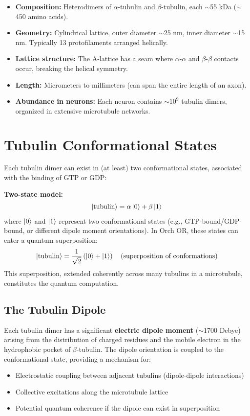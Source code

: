 \documentclass[11pt,a4paper]{report}
\begin{document}
\begin{biobox}
\begin{itemize}[leftmargin=1.5em]
  \item \textbf{Composition:} Heterodimers of $\alpha$-tubulin and $\beta$-tubulin, each $\sim$55 kDa ($\sim$450 amino acids).
  \item \textbf{Geometry:} Cylindrical lattice, outer diameter $\sim$25 nm, inner diameter $\sim$15 nm. Typically 13 protofilaments arranged helically.
  \item \textbf{Lattice structure:} The A-lattice has a seam where $\alpha$-$\alpha$ and $\beta$-$\beta$ contacts occur, breaking the helical symmetry.
  \item \textbf{Length:} Micrometers to millimeters (can span the entire length of an axon).
  \item \textbf{Abundance in neurons:} Each neuron contains $\sim 10^9$ tubulin dimers, organized in extensive microtubule networks.
\end{itemize}
\end{biobox}

\section{Tubulin Conformational States}

Each tubulin dimer can exist in (at least) two conformational states, associated with the binding of GTP or GDP:

\begin{mathbox}
\vspace{-6pt}
\textbf{Two-state model:}
\[
  \ket{\text{tubulin}} = \alpha\ket{0} + \beta\ket{1}
\]
where $\ket{0}$ and $\ket{1}$ represent two conformational states (e.g., GTP-bound/GDP-bound, or different dipole moment orientations). In Orch OR, these states can enter a quantum superposition:
\[
  \ket{\text{tubulin}} = \frac{1}{\sqrt{2}}\left(\ket{0} + \ket{1}\right) \quad \text{(superposition of conformations)}
\]
This superposition, extended coherently across many tubulins in a microtubule, constitutes the quantum computation.
\vspace{-4pt}
\end{mathbox}

\subsection{The Tubulin Dipole}

Each tubulin dimer has a significant \textbf{electric dipole moment} ($\sim$1700 Debye) arising from the distribution of charged residues and the mobile electron in the hydrophobic pocket of $\beta$-tubulin. The dipole orientation is coupled to the conformational state, providing a mechanism for:
\begin{itemize}[leftmargin=1.5em]
  \item Electrostatic coupling between adjacent tubulins (dipole-dipole interactions)
  \item Collective excitations along the microtubule lattice
  \item Potential quantum coherence if the dipole can exist in superposition
\end{itemize}
\end{document}
